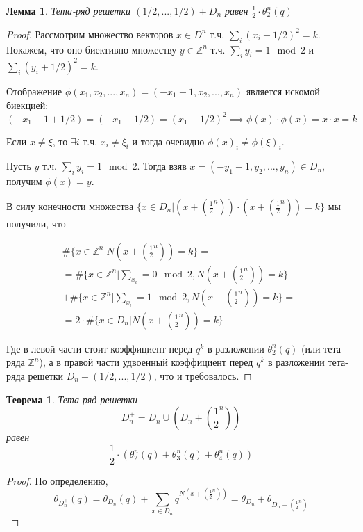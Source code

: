 \documentclass{article}
\newcommand{\ZZ}{\mathbb{Z}}
\theoremstyle{break}
\newtheorem{theorem}{Теорема}[section]
\newtheorem{lemma}{Лемма}[section]
\begin{document}
\begin{lemma}
	Тета-ряд решетки $(1/2, ..., 1/2) + D_n$ равен 
	$
	\frac{1}{2} \cdot \theta_{2}^n (q)
	$
\end{lemma}

\begin{proof}
	Рассмотрим множество векторов $x \in D^n$ т.ч. $\sum_i ({x_i} + 1/2)^2=k$.
	Покажем, что оно биективно множеству $y \in \ZZ^n$ т.ч. $\sum_i y_i = 1 \mod 2$ и $\sum_i ({y_i} + 1/2)^2=k$.
	
	Отображение $\phi(x_1, x_2, ..., x_n) = (-x_1 - 1, x_2, ..., x_n)$ является искомой биекцией:
		$$(-x_1 - 1 + 1/2) = (-x_1 - 1/2) = (x_1 + 1/2)^2 \implies \phi(x) \cdot \phi(x) = x \cdot x = k$$
		
	Если $x \ne \xi$, то $\exists i$ т.ч. $x_i \ne \xi_i$ и тогда очевидно $\phi(x)_i \ne \phi(\xi)_i$.
	
	Пусть $y$ т.ч. $\sum_i y_i = 1 \mod 2$. Тогда взяв $x=(-y_1-1, y_2, ..., y_n) \in D_n$, получим $\phi(x)=y$.
	
	В силу конечности множества $\{x \in D_n | (x + (\frac{1}{2}^n)) \cdot (x + (\frac{1}{2}^n)) = k\}$
	мы получили, что
	
	\begin{gather*}
		\#\{x \in \ZZ^n | N(x  + (\frac{1}{2}^n)) = k\} = \\
= \#\{x \in \ZZ^n | \sum_{x_i} = 0 \mod 2,  N(x  + (\frac{1}{2}^n)) = k\} + \\
+  \#\{x \in \ZZ^n | \sum_{x_i} = 1 \mod 2,  N(x  + (\frac{1}{2}^n)) = k\} = \\
=	2 \cdot \#\{x \in D_n | N(x  + (\frac{1}{2}^n)) = k\}
	\end{gather*}

	Где в левой части стоит коэффициент перед $q^k$ в разложении $\theta_2^n(q)$ 
	(или тета-ряда $\ZZ^n$), а в правой части удвоенный коэффициент перед $q^k$ в 
	разложении тета-ряда решетки $D_n + (1/2, ..., 1/2)$, что и требовалось.
\end{proof}

\begin{theorem}
	Тета-ряд решетки 
	$$
		D_n^+ = D_n \cup (D_n + (\frac{1}{2}^n))
	$$
	равен 
	$$
		\frac{1}{2} \cdot (\theta_{2}^n(q) + \theta_{3}^n(q) + \theta_4^n(q))
	$$
\end{theorem}
\begin{proof}
	По определению, 
	$$
	\theta_{D_n^+}(q) 
	= \theta_{D_n}(q) + \sum_{x \in D_n} q^{N(x + (\frac{1}{2}^n))}
	= \theta_{D_n} + \theta_{D_n + (\frac{1}{2}^n)}
	$$
\end{proof}
\end{document}
